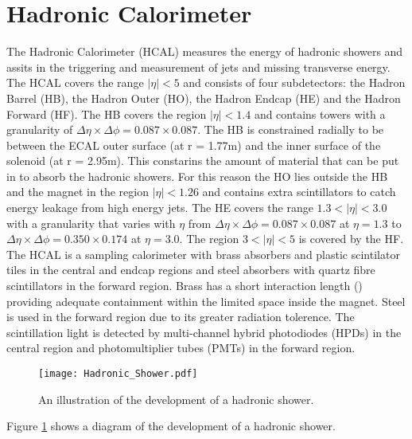 \section{Hadronic Calorimeter}

The Hadronic Calorimeter (HCAL) measures the energy of hadronic showers and
assits in the triggering and measurement of jets and missing transverse energy.
\\

The HCAL covers the range $|\eta| < 5$ and consists of four subdetectors: the
Hadron Barrel (HB), the Hadron Outer (HO), the Hadron Endcap (HE) and the Hadron
Forward (HF). The HB covers the region $|\eta| < 1.4$ and contains towers with a 
granularity of $\Delta\eta\times\Delta\phi = 0.087\times0.087$. The HB is 
constrained radially to be between the ECAL outer surface (at r = 1.77m) and the
inner surface of the solenoid (at r = 2.95m). This constarins the amount of 
material that can be put in to absorb the hadronic showers. For this reason the 
HO lies outside the HB and the magnet in the region $|\eta| < 1.26$ and contains
extra scintillators to catch energy leakage from high energy jets. The HE covers
the range $1.3 < |\eta| < 3.0$ with a granularity that varies with $\eta$ from 
$\Delta\eta\times\Delta\phi = 0.087\times0.087$ at $\eta = 1.3$ to 
$\Delta\eta\times\Delta\phi = 0.350\times0.174$ at $\eta = 3.0$. The region $3 <
 |\eta| < 5$ is covered by the HF. \\

The HCAL is a sampling calorimeter with brass absorbers and plastic scintilator
tiles in the central and endcap regions and steel absorbers with quartz fibre 
scintillators in the forward region. Brass has a short interaction length () 
providing adequate containment within the limited space inside the magnet. Steel 
is used in the forward region due to its greater radiation tolerence. The 
scintillation light is detected by multi-channel hybrid photodiodes (HPDs) in 
the central region and photomultiplier tubes (PMTs) in the forward region. \\

\begin{figure}
\begin{center}
\texttt{[image: Hadronic\_Shower.pdf]}
\end{center}
\caption{An illustration of the development of a hadronic shower.}
\label{fig:hadronic_shower}
\end{figure}

Figure \ref{fig:hadronic_shower} shows a diagram of the development of a
hadronic shower. \\

